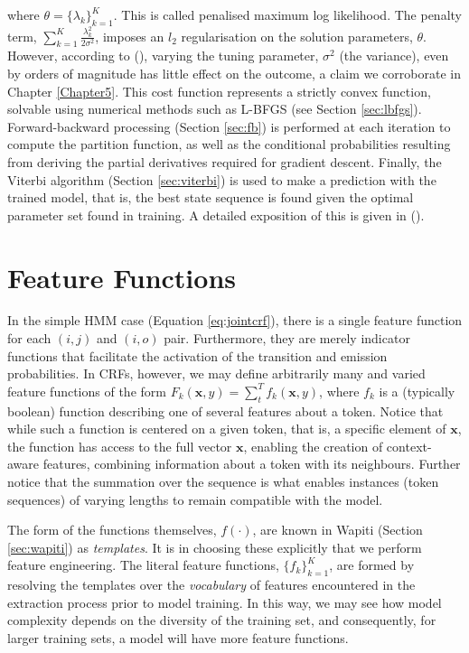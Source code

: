 where $\theta = \{\lambda_k\}_{k=1}^K$. This is called penalised maximum log likelihood. The penalty term, $\sum_{k=1}^K\frac{\lambda_k^2}{2\sigma^2}$, imposes an $l_2$ regularisation on the solution parameters, $\theta$. However, according to (\cite{mccallum2000maximum}), varying the tuning parameter, $\sigma^2$ (the variance), even by orders of magnitude has little effect on the outcome, a claim we corroborate in Chapter \ref{Chapter5}. This cost function represents a strictly convex function, solvable using numerical methods such as L-BFGS (see Section \ref{sec:lbfgs}). Forward-backward processing (Section \ref{sec:fb}) is performed at each iteration to compute the partition function, as well as the conditional probabilities resulting from deriving the partial derivatives required for gradient descent. Finally, the Viterbi algorithm (Section \ref{sec:viterbi}) is used to make a prediction with the trained model, that is, the best state sequence is found given the optimal parameter set found in training. A detailed exposition of this is given in (\cite{mccallum2000maximum}).

\section{Feature Functions}
\label{sec:featurefunctions}

In the simple HMM case (Equation \ref{eq:jointcrf}), there is a single feature function for each $(i, j)$ and $(i, o)$ pair. Furthermore, they are merely indicator functions that facilitate the activation of the transition and emission probabilities. In CRFs, however, we may define arbitrarily many and varied feature functions of the form $F_k(\mathbf{x}, y) = \sum_t^T f_k(\mathbf{x}, y)$, where $f_k$ is a (typically boolean) function describing one of several features about a token. Notice that while such a function is centered on a given token, that is, a specific element of $\mathbf{x}$, the function has access to the full vector $\mathbf{x}$, enabling the creation of context-aware features, combining information about a token with its neighbours. Further notice that the summation over the sequence is what enables instances (token sequences) of varying lengths to remain compatible with the model.

The form of the functions themselves, $f(\cdot)$, are known in Wapiti (Section \ref{sec:wapiti}) as \emph{templates}. It is in choosing these explicitly that we perform feature engineering. The literal feature functions, $\{f_k\}_{k=1}^K$, are formed by resolving the templates over the \emph{vocabulary} of features encountered in the extraction process prior to model training. In this way, we may see how model complexity depends on the diversity of the training set, and consequently, for larger training sets, a model will have more feature functions. 

